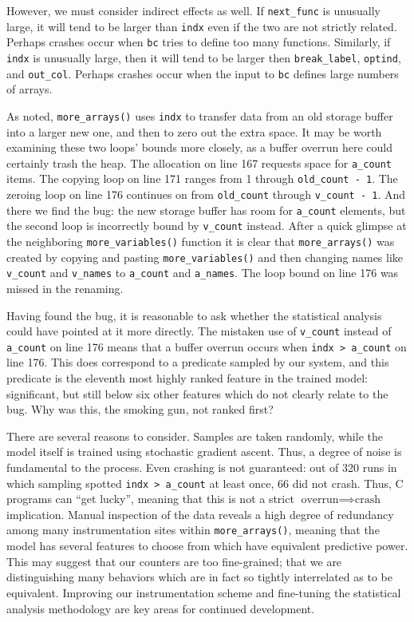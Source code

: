 However, we must consider indirect effects as well.  If
\texttt{next\_func} is unusually large, it will tend to be larger than
\texttt{indx} even if the two are not strictly related.  Perhaps
crashes occur when \texttt{bc} tries to define too many functions.
Similarly, if \texttt{indx} is unusually large, then it will tend to
be larger then \texttt{break\_label}, \texttt{optind}, and
\texttt{out\_col}.  Perhaps crashes occur when the input to
\texttt{bc} defines large numbers of arrays.

As noted, \texttt{more\_arrays()} uses \texttt{indx} to transfer data
from an old storage buffer into a larger new one, and then to zero out
the extra space.  It may be worth examining these two loops' bounds
more closely, as a buffer overrun here could certainly trash the heap.
The allocation on line 167 requests space for \texttt{a\_count} items.
The copying loop on line 171 ranges from 1 through \texttt{old\_count
  - 1}.  The zeroing loop on line 176 continues on from
\texttt{old\_count} through \texttt{v\_count - 1}.  And there we find
the bug: the new storage buffer has room for \texttt{a\_count}
elements, but the second loop is incorrectly bound by
\texttt{v\_count} instead.  After a quick glimpse at the neighboring
\texttt{more\_variables()} function it is clear that
\texttt{more\_arrays()} was created by copying and pasting
\texttt{more\_variables()} and then changing names like
\texttt{v\_count} and \texttt{v\_names} to \texttt{a\_count} and
\texttt{a\_names}.  The loop bound on line 176 was missed in the
renaming.

Having found the bug, it is reasonable to ask whether the statistical
analysis could have pointed at it more directly.  The mistaken use of
\texttt{v\_count} instead of \texttt{a\_count} on line 176 means that
a buffer overrun occurs when \texttt{indx > a\_count} on line 176.
This does correspond to a predicate sampled by our system, and this
predicate is the eleventh most highly ranked feature in the trained
model: significant, but still below six other features which do not
clearly relate to the bug.  Why was this, the smoking gun, not ranked
first?

There are several reasons to consider.  Samples are taken randomly,
while the model itself is trained using stochastic gradient ascent.
Thus, a degree of noise is fundamental to the process.  Even crashing
is not guaranteed: out of 320 runs in which sampling spotted
\texttt{indx > a\_count} at least once, 66 did not crash.  Thus, C
programs can ``get lucky'', meaning that this is not a strict
$\text{overrun} \implies \text{crash}$ implication.  Manual inspection
of the data reveals a high degree of redundancy among many
instrumentation sites within \texttt{more\_arrays()}, meaning that the
model has several features to choose from which have equivalent
predictive power.  This may suggest that our counters are too
fine-grained; that we are distinguishing many behaviors which are in
fact so tightly interrelated as to be equivalent.  Improving our
instrumentation scheme and fine-tuning the statistical analysis
methodology are key areas for continued development.

